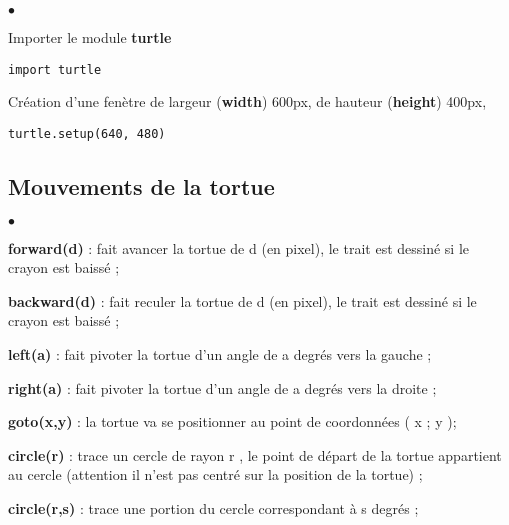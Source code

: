 \documentclass[10pt,dvipsnames,  dvips]{article}
\begin{document}
\begin{list}{$\bullet$}{}
\item Importer le module \textbf{turtle}  
\begin{lstlisting}
import turtle
\end{lstlisting}
\item Création d'une fenètre de largeur  (\textbf{width})  600px, de hauteur (\textbf{height}) 400px, \\
\begin{lstlisting}
turtle.setup(640, 480) 
\end{lstlisting}
\end{list}

\begin{center}
\end{center}

\subsection{ Mouvements de la tortue}

\begin{list}{$\bullet$}{}
\item  \textbf{forward(d)} : fait avancer la tortue de d (en pixel), le trait est dessiné si le crayon est baissé ;
\item  \textbf{backward(d)} : fait reculer la tortue de d (en pixel), le trait est dessiné si le crayon est baissé ;
\item  \textbf{left(a)} : fait pivoter la tortue d’un angle de a degrés vers la gauche ;
\item  \textbf{right(a)} : fait pivoter la tortue d’un angle de a degrés vers la droite ;
\item  \textbf{goto(x,y)} : la tortue va se positionner au point de coordonnées ( x ; y );
\item  \textbf{circle(r)} : trace un cercle de rayon r , le point de départ de la tortue appartient au cercle (attention il n’est
pas centré sur la position de la tortue) ;
\item  \textbf{circle(r,s)} : trace une portion du cercle correspondant à s degrés ;
\end{list}
\end{document}
